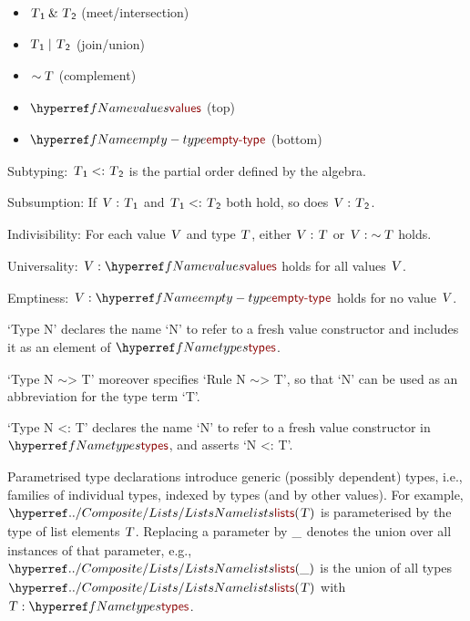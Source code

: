 \begin{itemize}
\item{} $\SHADE{\VAR{T}\SUB{1} \mathbin{\&} \VAR{T}\SUB{2}}$    (meet/intersection)
\item{} $\SHADE{\VAR{T}\SUB{1}  \mid \VAR{T}\SUB{2}}$    (join/union)
\item{} $\SHADE{\mathop{\sim} \VAR{T}}$        (complement)
\item{} $\SHADE{\NAMEREF{values}}$     (top)
\item{} $\SHADE{\NAMEREF{empty-type}}$ (bottom)
\end{itemize}

Subtyping: $\SHADE{\VAR{T}\SUB{1} <: \VAR{T}\SUB{2}}$ is the partial order defined by the algebra.

Subsumption: If $\SHADE{ \VAR{V} : \VAR{T}\SUB{1}}$ and $\SHADE{\VAR{T}\SUB{1} <: \VAR{T}\SUB{2}}$ both hold, so does $\SHADE{ \VAR{V} : \VAR{T}\SUB{2}}$.

Indivisibility: For each value $\SHADE{\VAR{V}}$ and type $\SHADE{\VAR{T}}$, either $\SHADE{ \VAR{V} : \VAR{T}}$ or
  $\SHADE{ \VAR{V} : \mathop{\sim} \VAR{T}}$ holds.

Universality: $\SHADE{ \VAR{V} : \NAMEREF{values}}$ holds for all values $\SHADE{\VAR{V}}$.

Emptiness: $\SHADE{ \VAR{V} : \NAMEREF{empty-type}}$ holds for no value $\SHADE{\VAR{V}}$.

{}`Type N{}' declares the name {}`N{}' to refer to a fresh value constructor
  and includes it as an element of $\SHADE{\NAMEREF{types}}$.

{}`Type N \ensuremath{\sim}\textgreater{} T{}' moreover specifies {}`Rule N \ensuremath{\sim}\textgreater{} T{}', so that {}`N{}' can be used as
  an abbreviation for the type term {}`T{}'.

{}`Type N \textless{}: T{}' declares the name {}`N{}' to refer to a fresh value constructor
  in $\SHADE{\NAMEREF{types}}$, and asserts {}`N \textless{}: T{}'.

Parametrised type declarations introduce generic (possibly dependent) types, 
  i.e., families of individual types, indexed by types (and by other values). 
  For example, $\SHADE{\NAMEHYPER{../Composite}{Lists}{lists}
           (  \VAR{T} )}$ is parameterised by the type of list elements $\SHADE{\VAR{T}}$.
  Replacing a parameter by $\strut\_\strut$ denotes the union over all instances of that
  parameter, e.g., $\SHADE{\NAMEHYPER{../Composite}{Lists}{lists}
           (  \_ )}$ is the union of all types $\SHADE{\NAMEHYPER{../Composite}{Lists}{lists}
           (  \VAR{T} )}$ with $\SHADE{\VAR{T} : \NAMEREF{types}}$.

